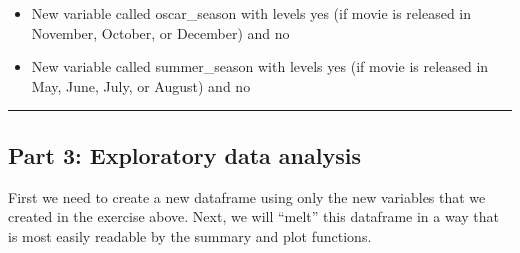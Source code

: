 \documentclass[]{article}
\newenvironment{Shaded}{\begin{snugshade}}{\end{snugshade}}
\newcommand{\KeywordTok}[1]{\textcolor[rgb]{0.13,0.29,0.53}{\textbf{#1}}}
\newcommand{\DataTypeTok}[1]{\textcolor[rgb]{0.13,0.29,0.53}{#1}}
\newcommand{\DecValTok}[1]{\textcolor[rgb]{0.00,0.00,0.81}{#1}}
\newcommand{\StringTok}[1]{\textcolor[rgb]{0.31,0.60,0.02}{#1}}
\newcommand{\OperatorTok}[1]{\textcolor[rgb]{0.81,0.36,0.00}{\textbf{#1}}}
\newcommand{\NormalTok}[1]{#1}
\providecommand{\tightlist}{%
  \setlength{\itemsep}{0pt}\setlength{\parskip}{0pt}}
\begin{document}
\begin{itemize}
\tightlist
\item
  New variable called oscar\_season with levels yes (if movie is
  released in November, October, or December) and no
\item
  New variable called summer\_season with levels yes (if movie is
  released in May, June, July, or August) and no
\end{itemize}

\begin{Shaded}
\end{Shaded}

\begin{center}\rule{0.5\linewidth}{\linethickness}\end{center}

\subsection{Part 3: Exploratory data
analysis}\label{part-3-exploratory-data-analysis}

First we need to create a new dataframe using only the new variables
that we created in the exercise above. Next, we will ``melt'' this
dataframe in a way that is most easily readable by the summary and plot
functions.
\end{document}
